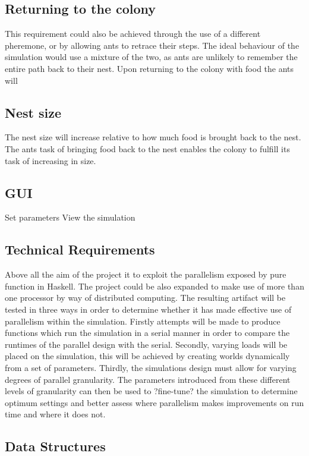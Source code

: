 \documentclass[main.tex]{subfiles}
\begin{document}
\subsection{Returning to the colony}
This requirement could also be achieved through the use of a different pheremone, or by allowing ants to retrace their steps. The ideal behaviour of the simulation would use a mixture of the two, as ants are unlikely to remember the entire path back to their nest. Upon returning to the colony with food the ants will

\subsection{Nest size}
The nest size will increase relative to how much food is brought back to the nest. The ants task of bringing food back to the nest enables the colony to fulfill its task of increasing in size.

\subsection{GUI}
Set parameters
View the simulation


\subsection{Technical Requirements}
Above all the aim of the project it to exploit the parallelism exposed by pure function in Haskell. The project could be also expanded to make use of more than one processor by way of distributed computing. The resulting artifact will be tested in three ways in order to determine whether it has made effective use of parallelism within the simulation. Firstly attempts will be made to produce functions which run the simulation in a serial manner in order to compare the runtimes of the parallel design with the serial. Secondly, varying loads will be placed on the simulation, this will be achieved by creating worlds dynamically from a set of parameters. Thirdly, the simulations design must allow for varying degrees of parallel granularity. The parameters introduced from these different levels of granularity can then be used to ?fine-tune? the simulation to determine optimum settings and better assess where parallelism makes improvements on run time and where it does not.

\subsection{Data Structures}
\end{document}

